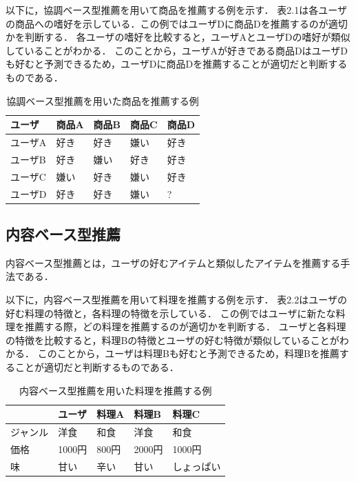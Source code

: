 \documentclass{funthesis}
\begin{document}
以下に，協調ベース型推薦を用いて商品を推薦する例を示す．
表2.1は各ユーザの商品への嗜好を示している．この例ではユーザDに商品Dを推薦するのが適切かを判断する．
各ユーザの嗜好を比較すると，ユーザAとユーザDの嗜好が類似していることがわかる．
このことから，ユーザAが好きである商品DはユーザDも好むと予測できるため，ユーザDに商品Dを推薦することが適切だと判断するものである．

\begin{table}[htb]
  \begin{center}
  \scriptsize
    \caption{協調ベース型推薦を用いた商品を推薦する例}
    \normalsize
   \begin{tabular}{p{2.5cm}||p{2.5cm}|p{2.5cm}|p{2.5cm}|p{2.5cm}}
    \hline
ユーザ & 商品A & 商品B & 商品C & 商品D \\ \hline\hline
      ユーザA & 好き & 好き & 嫌い & 好き \\ \hline
      ユーザB & 好き & 嫌い & 好き & 好き \\ \hline
      ユーザC & 嫌い & 好き & 嫌い & 好き \\ \hline
      ユーザD & 好き & 好き & 嫌い & ? \\ \hline
  \end{tabular}
  \end{center}
\end{table}

\subsection{内容ベース型推薦}
内容ベース型推薦とは，ユーザの好むアイテムと類似したアイテムを推薦する手法である．

以下に，内容ベース型推薦を用いて料理を推薦する例を示す．
表2.2はユーザの好む料理の特徴と，各料理の特徴を示している．
この例ではユーザに新たな料理を推薦する際，どの料理を推薦するのが適切かを判断する．
ユーザと各料理の特徴を比較すると，料理Bの特徴とユーザの好む特徴が類似していることがわかる．
このことから，ユーザは料理Bも好むと予測できるため，料理Bを推薦することが適切だと判断するものである．

\begin{table}[htb]
  \begin{center}
  \scriptsize
    \caption{内容ベース型推薦を用いた料理を推薦する例}
    \normalsize
   \begin{tabular}{p{2.5cm}|p{2.5cm}||p{2.5cm}|p{2.5cm}|p{2.5cm}}
    \hline
    & ユーザ & 料理A & 料理B & 料理C  \\ \hline\hline
      ジャンル & 洋食 & 和食 & 洋食 & 和食 \\ \hline
      価格 & 1000円 & 800円 & 2000円 & 1000円 \\ \hline
      味 & 甘い & 辛い & 甘い & しょっぱい \\ \hline
  \end{tabular}
  \end{center}
\end{table}
\end{document}
